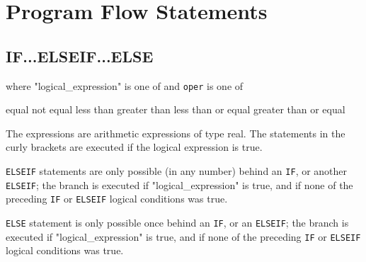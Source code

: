 
\chapter{Program Flow Statements}

 




\section{IF...ELSEIF...ELSE}
\label{sec:if}


where "logical\_expression" is one of 
and \texttt{oper} is one of 
\begin{madlist}
\ttitem{==}  equal
\ttitem{<>}  not equal
\ttitem{<}  less than
\ttitem{>}  greater than
\ttitem{<=}  less than or equal
\ttitem{>=}  greater than or equal
\end{madlist}

The expressions are arithmetic expressions of type real. The statements
in the curly brackets are executed if the logical expression is true.  

\texttt{ELSEIF} statements are only possible (in any number) behind an
\texttt{IF}, or another \texttt{ELSEIF}; the branch is executed if
"logical\_expression" is true, and if none of the preceding \texttt{IF}
or \texttt{ELSEIF} logical conditions was true.   


\texttt{ELSE} statement is only possible once behind an \texttt{IF}, or
an \texttt{ELSEIF}; the branch is executed if "logical\_expression" is
true, and if none of the preceding \texttt{IF} or \texttt{ELSEIF}
logical conditions was true.   

